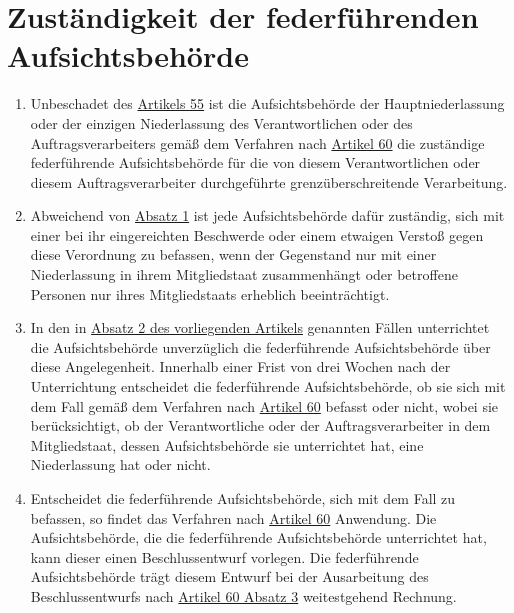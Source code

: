 \chapter{Zuständigkeit der federführenden Aufsichtsbehörde}
\label{ch:56}


\begin{enumerate}

  \item Unbeschadet des \hyperref[ch:55]{Artikels 55} ist die Aufsichtsbehörde der Hauptniederlassung oder der einzigen
   Niederlassung des Verantwortlichen oder des Auftragsverarbeiters gemäß dem Verfahren nach \hyperref[ch:60]
   {Artikel 60} die zuständige federführende Aufsichtsbehörde für die von diesem Verantwortlichen oder diesem
   Auftragsverarbeiter durchgeführte grenzüberschreitende Verarbeitung.
  \label{itm:56-1}

  \item Abweichend von \hyperref[itm:56-1]{Absatz 1} ist jede Aufsichtsbehörde dafür zuständig, sich mit einer bei ihr
   eingereichten Beschwerde oder einem etwaigen Verstoß gegen diese Verordnung zu befassen, wenn der Gegenstand nur mit
   einer Niederlassung in ihrem Mitgliedstaat zusammenhängt oder betroffene Personen nur ihres Mitgliedstaats erheblich
   beeinträchtigt.
  \label{itm:56-2}

  \item In den in \hyperref[itm:56-2]{Absatz 2 des vorliegenden Artikels} genannten Fällen unterrichtet die
   Aufsichtsbehörde unverzüglich die federführende Aufsichtsbehörde über diese Angelegenheit. Innerhalb einer Frist von
   drei Wochen nach der Unterrichtung entscheidet die federführende Aufsichtsbehörde, ob sie sich mit dem Fall gemäß
   dem Verfahren nach \hyperref[ch:60]{Artikel 60} befasst oder nicht, wobei sie berücksichtigt, ob der Verantwortliche
   oder der Auftragsverarbeiter in dem Mitgliedstaat, dessen Aufsichtsbehörde sie unterrichtet hat, eine Niederlassung
   hat oder nicht.
  \label{itm:56-3}

  \item Entscheidet die federführende Aufsichtsbehörde, sich mit dem Fall zu befassen, so findet das Verfahren nach
   \hyperref[ch:60]{Artikel 60} Anwendung. Die Aufsichtsbehörde, die die federführende Aufsichtsbehörde unterrichtet
    hat, kann dieser einen Beschlussentwurf vorlegen. Die federführende Aufsichtsbehörde trägt diesem Entwurf bei der
    Ausarbeitung des Beschlussentwurfs nach \hyperref[itm:60-3]{Artikel 60 Absatz 3} weitestgehend Rechnung.
  \label{itm:56-4}


\end{enumerate}
